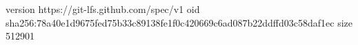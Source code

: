 version https://git-lfs.github.com/spec/v1
oid sha256:78a40e1d9675fed75b33c89138fe1f0c420669c6ad087b22ddffd03c58daf1ec
size 512901
